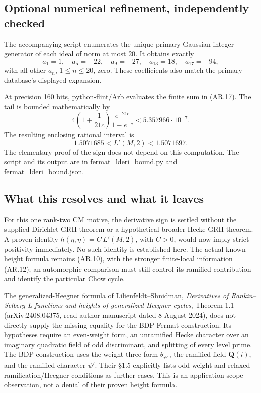 \documentclass[11pt,a4paper]{article}
\begin{document}
\subsection{Optional numerical refinement, independently
checked}\label{optional-numerical-refinement-independently-checked}

The accompanying script enumerates the unique primary Gaussian-integer
generator of each ideal of norm at most \(20\). It obtains exactly \[
a_1=1,\quad a_5=-22,\quad a_9=-27,\quad a_{13}=18,\quad a_{17}=-94,
\] with all other \(a_n\), \(1\le n\le20\), zero. These coefficients
also match the primary database's displayed expansion.

At precision 160 bits, python-flint/Arb evaluates the finite sum in
(AR.17). The tail is bounded mathematically by \[
4\left(1+\frac1{21c}\right)\frac{e^{-21c}}{1-e^{-c}}
 <5.357966\cdot10^{-7}.
\] The resulting enclosing rational interval is \[
1.5071685<L'(M,2)<1.5071697.
\tag{AR.18}
\] The elementary proof of the sign does not depend on this computation.
The script and its output are in fermat\_lderi\_bound.py and
fermat\_lderi\_bound.json.

\subsection{What this resolves and what it
leaves}\label{what-this-resolves-and-what-it-leaves}

For this one rank-two CM motive, the derivative sign is settled without
the supplied Dirichlet-GRH theorem or a hypothetical broader Hecke-GRH
theorem. A proven identity \(h(\eta,\eta)=C\,L'(M,2)\), with \(C>0\),
would now imply strict positivity immediately. No such identity is
established here. The actual known height formula remains (AR.10), with
the stronger finite-local information (AR.12); an automorphic comparison
must still control its ramified contribution and identify the particular
Chow cycle.

The generalized-Heegner formula of Lilienfeldt--Shnidman,
\emph{Derivatives of Rankin--Selberg L-functions and heights of
generalized Heegner cycles}, Theorem 1.1 (arXiv:2408.04375, read author
manuscript dated 8 August 2024), does not directly supply the missing
equality for the BDP Fermat construction. Its hypotheses require an
even-weight form, an unramified Hecke character over an imaginary
quadratic field of odd discriminant, and splitting of every level prime.
The BDP construction uses the weight-three form \(\theta_{\psi^2}\), the
ramified field \(\mathbf Q(i)\), and the ramified character \(\psi'\).
Their §1.5 explicitly lists odd weight and relaxed ramification/Heegner
conditions as further cases. This is an application-scope observation,
not a denial of their proven height formula.
\end{document}
